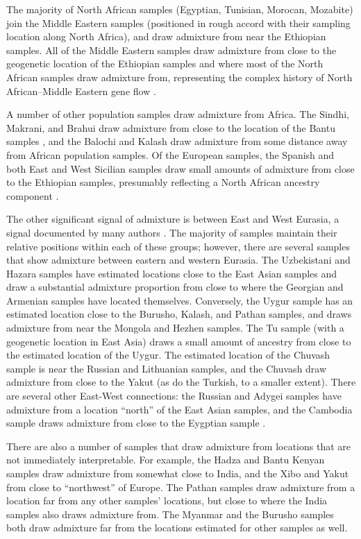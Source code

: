 \documentclass[10pt,letterpaper]{article}
\begin{document}
The majority of North African samples (Egyptian, Tunisian, Morocan, Mozabite) join the Middle Eastern samples (positioned in rough accord with their sampling location along North Africa), and draw admixture from near the Ethiopian samples. All of the Middle Eastern samples draw admixture from close to the geogenetic location of the Ethiopian samples and where most of the North African samples draw admixture from, representing the complex history of North African--Middle Eastern gene flow \cite{henn_genomic_2012,Hellenthal}. 

A number of other population samples draw admixture from Africa. The Sindhi, Makrani, and Brahui draw admixture from close to the location of the Bantu samples  \cite{Hellenthal}, and the Balochi and Kalash draw admixture from some distance away from African population samples.  Of the European samples, the Spanish and both East and West Sicilian samples draw small amounts of admixture from close to the Ethiopian samples, presumably reflecting a North African ancestry component  \cite{moorjani_history_2011,botigue_gene_2013}. 

The other significant signal of admixture is between East and West Eurasia, a signal documented by many authors \cite{rosenberg_genetic_2002,li_worldwide_2008, xu_genome-wide_2008,Hellenthal}. The majority of samples maintain their relative positions within each of these groups; however, there are several samples that show admixture between eastern and western Eurasia.  The Uzbekistani and Hazara samples have estimated locations close to the East Asian samples and draw a substantial admixture proportion from close to where the Georgian and Armenian samples have located themselves.  Conversely, the Uygur sample has an estimated location close to the Burusho, Kalash, and Pathan samples, and draws admixture from near the Mongola and Hezhen samples. The Tu sample (with a geogenetic location in East Asia) draws a small amount of ancestry from close to the estimated location of the Uygur. The estimated location of the Chuvash sample is near the Russian and Lithuanian samples, and the Chuvash draw admixture from close to the Yakut (as do the Turkish, to a smaller extent). There are several other East-West connections: the Russian and Adygei samples have admixture from a location ``north'' of the East Asian samples, and the Cambodia sample draws admixture from close to the Eygptian sample \cite{Treemix, Hellenthal}. 

There are also a number of samples that draw admixture from locations that are not immediately interpretable.  
For example, the Hadza and Bantu Kenyan samples draw admixture from somewhat close to India, 
and the Xibo and Yakut from close to ``northwest'' of Europe.  
The Pathan samples draw admixture from a location far from any other samples' locations, 
but close to where the India samples also draws admixture from. 
The Myanmar and the Burusho samples both draw admixture far from the locations estimated for other samples as well.
\end{document}
